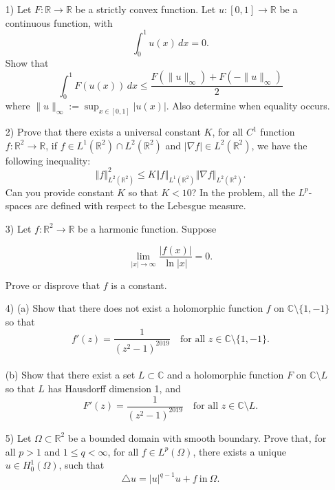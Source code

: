 \documentclass[10pt]{article}
\renewcommand{\leq}{\leqslant}
\begin{document}
\begin{enumerate}


\item[1)]Let $F \colon \mathbb{R} \to \mathbb{R}$ be a strictly convex function. Let $u \colon [0,1] \to \mathbb{R}$ be a continuous function, with $$\int_0^1 u(x) \, dx = 0.$$ Show that
$$
\int_0^1 F(u(x)) \, dx \leq \frac{ F(\|u\|_{\infty}) + F(-\|u\|_{\infty}) }{2}
$$
where $\displaystyle{ \|u\|_{\infty} := \sup_{x \in [0,1]} |u(x)|}$. Also determine when equality occurs.

\item[2)]
Prove that there exists a universal constant $K$,   for  all $C^1$ function $f: \mathbb{R}^2 \rightarrow \mathbb{R}$, if  $f\in L^{1}\left(
\mathbb{R}^{2}\right) \cap L^2\left( \mathbb{R}^{2}\right) $ and $|\nabla f| \in L^2(\mathbb{R}^2)$, we have the following inequality:
\[
\left\Vert f\right\Vert _{L^{2}\left( \mathbb{R}^{2}\right) }^{2}\leq
K\left\Vert f\right\Vert _{L^{1}\left( \mathbb{R}^{2}\right) }\left\Vert
\nabla f\right\Vert _{L^{2}\left( \mathbb{R}^{2}\right) }\text{.}
\]
Can you provide constant $K$ so that $K<10$? In the problem, all the $L^p$-spaces are defined with respect to the Lebesgue measure.

\item[3)]Let $f: \mathbb{R}^2 \rightarrow \mathbb{R}$ be a harmonic function. Suppose

$$ \lim_{|x| \rightarrow \infty} \frac{|f(x)|}{\ln |x|}=0.$$

Prove or disprove that $f$ is a constant.
\item[4)](a) Show that there does not exist a holomorphic function $f$ on $\mathbb{C} \setminus \{1, -1\}$ so that $$f'(z) = \frac{1}{(z^2-1)^{2019}} \quad \text{for all $z \in \mathbb{C} \setminus \{1, -1\}$}.$$ \\
(b) Show that there exist a set $L \subset \mathbb{C}$ and a holomorphic function $F$ on $\mathbb{C} \setminus L$ so that $L$ has Hausdorff dimension 1, and $$F'(z) = \frac{1}{(z^2-1)^{2019}} \quad \text{for all $z \in \mathbb{C} \setminus L$}.$$

\item[5)]
Let $\Omega \subset \mathbb{R}^2$ be a bounded domain with smooth
boundary. Prove that, for all $p>1$ and $1\leq q<\infty$, for all
$f\in L^p(\Omega)$, there exists a unique $u\in H^1_0(\Omega)$, such
that
\[\triangle u = |u|^{q-1} u+f  \  \text{in} \ \Omega.\]
\end{enumerate}
\end{document}
